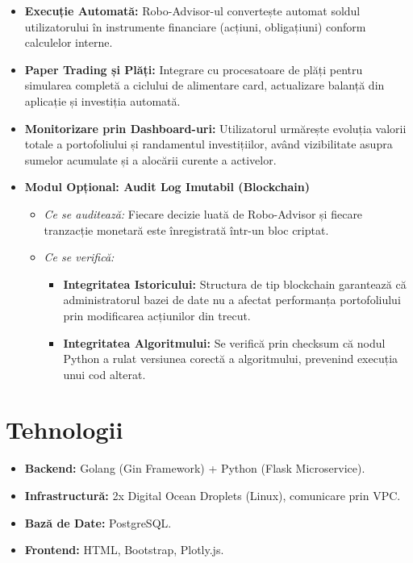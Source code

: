 \documentclass[12pt, a4paper]{article}
\begin{document}
\begin{itemize}
    \item \textbf{Execuție Automată:} Robo-Advisor-ul convertește automat soldul utilizatorului în instrumente financiare (acțiuni, obligațiuni) conform calculelor interne.
    
    \item \textbf{Paper Trading și Plăți:} Integrare cu procesatoare de plăți pentru simularea completă a ciclului de alimentare card, actualizare balanță din aplicație și investiția automată.
    
    \item \textbf{Monitorizare prin Dashboard-uri:} Utilizatorul urmărește evoluția valorii totale a portofoliului și randamentul investițiilor, având vizibilitate asupra sumelor acumulate și a alocării curente a activelor.
    
    \item \textbf{Modul Opțional: Audit Log Imutabil (Blockchain)}
    \begin{itemize}
        \item \textit{Ce se auditează:} Fiecare decizie luată de Robo-Advisor și fiecare tranzacție monetară este înregistrată într-un bloc criptat.
        \item \textit{Ce se verifică:}
        \begin{itemize}
            \item \textbf{Integritatea Istoricului:} Structura de tip blockchain garantează că administratorul bazei de date nu a afectat performanța portofoliului prin modificarea acțiunilor din trecut.
            \item \textbf{Integritatea Algoritmului:} Se verifică prin checksum că nodul Python a rulat versiunea corectă a algoritmului, prevenind execuția unui cod alterat.
        \end{itemize}
    \end{itemize}
\end{itemize}

\section{Tehnologii}

\begin{itemize}
    \item \textbf{Backend:} Golang (Gin Framework) + Python (Flask Microservice).
    \item \textbf{Infrastructură:} 2x Digital Ocean Droplets (Linux), comunicare prin VPC.
    \item \textbf{Bază de Date:} PostgreSQL.
    \item \textbf{Frontend:} HTML, Bootstrap, Plotly.js.
\end{itemize}
\end{document}
